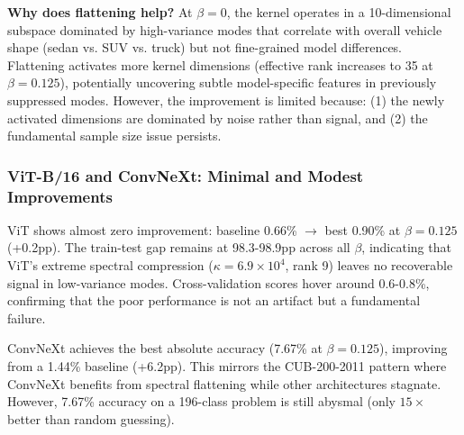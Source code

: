 \documentclass[11pt]{article}
\begin{document}
\textbf{Why does flattening help?} At $\beta=0$, the kernel operates in a 10-dimensional subspace dominated by high-variance modes that correlate with overall vehicle shape (sedan vs. SUV vs. truck) but not fine-grained model differences. Flattening activates more kernel dimensions (effective rank increases to 35 at $\beta=0.125$), potentially uncovering subtle model-specific features in previously suppressed modes. However, the improvement is limited because: (1) the newly activated dimensions are dominated by noise rather than signal, and (2) the fundamental sample size issue persists.

\subsubsection{ViT-B/16 and ConvNeXt: Minimal and Modest Improvements}

ViT shows almost zero improvement: baseline 0.66\% $\to$ best 0.90\% at $\beta=0.125$ (+0.2pp). The train-test gap remains at 98.3-98.9pp across all $\beta$, indicating that ViT's extreme spectral compression ($\kappa = 6.9 \times 10^4$, rank 9) leaves no recoverable signal in low-variance modes. Cross-validation scores hover around 0.6-0.8\%, confirming that the poor performance is not an artifact but a fundamental failure.

ConvNeXt achieves the best absolute accuracy (7.67\% at $\beta=0.125$), improving from a 1.44\% baseline (+6.2pp). This mirrors the CUB-200-2011 pattern where ConvNeXt benefits from spectral flattening while other architectures stagnate. However, 7.67\% accuracy on a 196-class problem is still abysmal (only $15\times$ better than random guessing).
\end{document}
